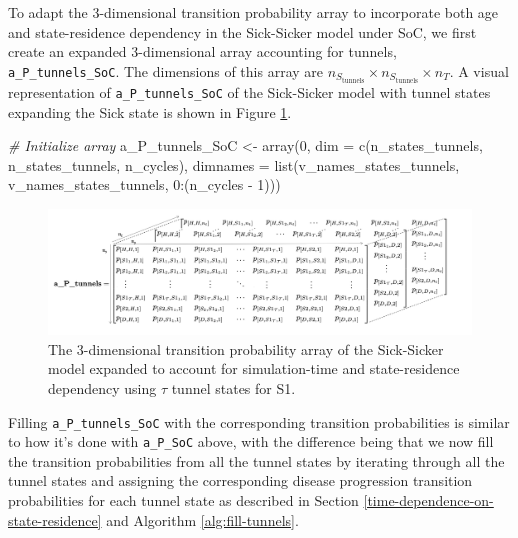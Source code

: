 \documentclass[
]{article}
\newenvironment{Shaded}{\begin{snugshade}}{\end{snugshade}}
\newcommand{\AttributeTok}[1]{\textcolor[rgb]{0.77,0.63,0.00}{#1}}
\newcommand{\CommentTok}[1]{\textcolor[rgb]{0.56,0.35,0.01}{\textit{#1}}}
\newcommand{\DecValTok}[1]{\textcolor[rgb]{0.00,0.00,0.81}{#1}}
\newcommand{\FunctionTok}[1]{\textcolor[rgb]{0.00,0.00,0.00}{#1}}
\newcommand{\NormalTok}[1]{#1}
\newcommand{\OtherTok}[1]{\textcolor[rgb]{0.56,0.35,0.01}{#1}}
\newcommand{\SpecialCharTok}[1]{\textcolor[rgb]{0.00,0.00,0.00}{#1}}
\begin{document}
To adapt the 3-dimensional transition probability array to incorporate both age and state-residence dependency in the Sick-Sicker model under SoC, we first create an expanded 3-dimensional array accounting for tunnels, \texttt{a\_P\_tunnels\_SoC}. The dimensions of this array are \(n_{S_{\text{tunnels}}} \times n_{S_{\text{tunnels}}} \times n_T\). A visual representation of \texttt{a\_P\_tunnels\_SoC} of the Sick-Sicker model with tunnel states expanding the Sick state is shown in Figure \ref{fig:Array-Time-Dependent-Tunnels}.

\begin{Shaded}
\begin{Highlighting}[]
\CommentTok{\# Initialize array}
\NormalTok{a\_P\_tunnels\_SoC }\OtherTok{\textless{}{-}} \FunctionTok{array}\NormalTok{(}\DecValTok{0}\NormalTok{, }\AttributeTok{dim =} \FunctionTok{c}\NormalTok{(n\_states\_tunnels, n\_states\_tunnels, n\_cycles),}
                         \AttributeTok{dimnames =} \FunctionTok{list}\NormalTok{(v\_names\_states\_tunnels, }
\NormalTok{                                         v\_names\_states\_tunnels, }
                                         \DecValTok{0}\SpecialCharTok{:}\NormalTok{(n\_cycles }\SpecialCharTok{{-}} \DecValTok{1}\NormalTok{)))}
\end{Highlighting}
\end{Shaded}

\begin{figure}[H]

{\centering \includegraphics[width=1\linewidth]{figs/3D-state-transition-array-sick-sicker-tunnels} 

}

\caption{The 3-dimensional transition probability array of the Sick-Sicker model expanded to account for simulation-time and state-residence dependency using $\tau$ tunnel states for S1.}\label{fig:Array-Time-Dependent-Tunnels}
\end{figure}

Filling \texttt{a\_P\_tunnels\_SoC} with the corresponding transition probabilities is similar to how it's done with \texttt{a\_P\_SoC} above, with the difference being that we now fill the transition probabilities from all the tunnel states by iterating through all the tunnel states and assigning the corresponding disease progression transition probabilities for each tunnel state as described in Section \ref{time-dependence-on-state-residence} and Algorithm \ref{alg:fill-tunnels}.
\end{document}

